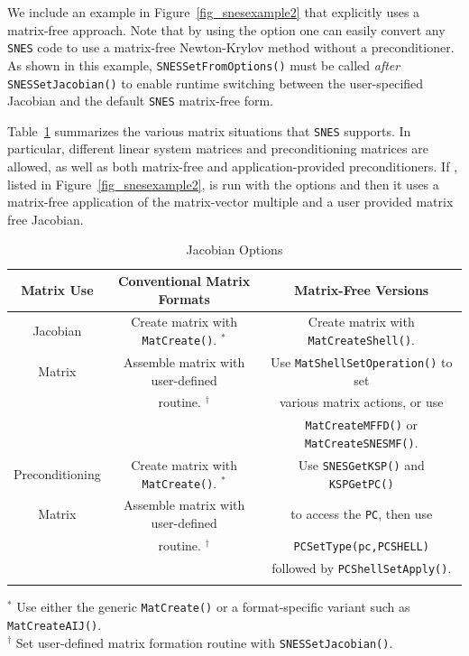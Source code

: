 We include an example in Figure~\ref{fig_snesexample2} that explicitly
uses a matrix-free approach.  Note that by using the option
 one can easily convert any \lstinline{SNES} code to use a matrix-free
Newton-Krylov method without a preconditioner.  As shown in this
example, \lstinline{SNESSetFromOptions()} must be called {\em after}
\lstinline{SNESSetJacobian()} to enable runtime switching between the
user-specified Jacobian and the default \lstinline{SNES} matrix-free form.

Table~\ref{tab_jacobians} summarizes the various matrix situations
that \lstinline{SNES} supports.  In particular, different linear system matrices
and preconditioning matrices are allowed, as well as both matrix-free
and application-provided preconditioners.  If
\href{https://www.mcs.anl.gov/petsc/petsc-current/src/snes/examples/tutorials/ex3.c.html}{},
 listed in Figure~\ref{fig_snesexample2}, is run with the options  and  then it uses a matrix-free application of the matrix-vector multiple and a user provided matrix free Jacobian.

\begin{center}
\begin{table}
\begin{tabular}{ccc}
{\bf Matrix Use} & {\bf Conventional Matrix Formats}                & {\bf Matrix-Free Versions}\\
\hline
Jacobian         & Create matrix with \lstinline|MatCreate()|. $^*$ & Create matrix with \lstinline|MatCreateShell()|.\\
Matrix           & Assemble matrix with user-defined                & Use \lstinline|MatShellSetOperation()| to set\\
                 & routine. $ ^\dagger $                            & various matrix actions, or use\\
                 &                                                  & \lstinline|MatCreateMFFD()| or \lstinline|MatCreateSNESMF()|.\\
\hline
Preconditioning  & Create matrix with \lstinline|MatCreate()|. $^*$ & Use \lstinline|SNESGetKSP()| and \lstinline|KSPGetPC()| \\
Matrix           & Assemble matrix with user-defined                & to access the \lstinline|PC|, then use\\
                 & routine. $ ^\dagger $                            & \lstinline|PCSetType(pc,PCSHELL)|\\
                 &                                                  & followed by \lstinline|PCShellSetApply()|. \\

\hline
& & \\
\end{tabular}
\medskip
$^*$ Use either the generic \lstinline|MatCreate()| or a format-specific variant
   such as \lstinline|MatCreateAIJ()|.\\
$^\dagger$ Set user-defined matrix formation routine with \lstinline{SNESSetJacobian()}.
\medskip
\caption{Jacobian Options}
\label{tab_jacobians}
\end{table}
\end{center}

